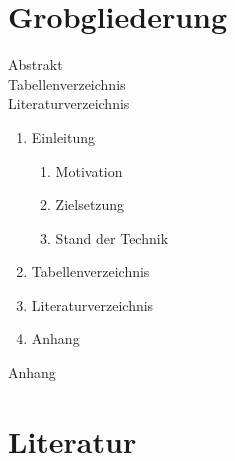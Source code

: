 \documentclass[12pt,a4paper]{article}
\begin{document}
\section*{Grobgliederung}
Abstrakt\\
Tabellenverzeichnis\\
Literaturverzeichnis
\begin{enumerate}
	\item Einleitung
	\begin{enumerate}
		\item Motivation
		\item Zielsetzung
		\item Stand der Technik
	\end{enumerate}
	\item Tabellenverzeichnis
	\item Literaturverzeichnis
	\item Anhang
\end{enumerate}
Anhang\\

\section*{Literatur}
\end{document}

